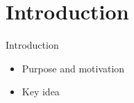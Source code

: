 \section{Introduction}
\begin{frame}{Introduction}
  \begin{itemize}
    \item Purpose and motivation
    \item Key idea
  \end{itemize}
\end{frame}
